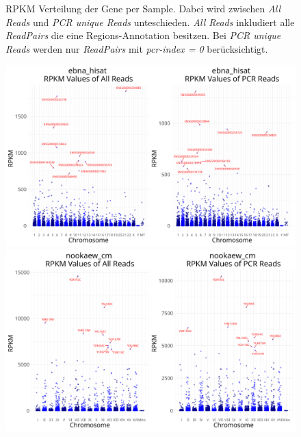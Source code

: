\documentclass[12pt]{article}
\begin{document}
\begin{figure}[htpb]
\begin{minipage}[t]{0.32\textwidth}
    \end{minipage}
    \caption{RPKM Verteilung der Gene per Sample. Dabei wird zwischen \textit{All Reads} und \textit{PCR unique Reads} unteschieden.
    \textit{All Reads} inkludiert alle \textit{ReadPairs} die eine Regions-Annotation besitzen. Bei \textit{PCR unique Reads} 
    werden nur \textit{ReadPairs} mit \textit{pcr-index = 0} berücksichtigt.}
    \label{fig:density}
\end{figure}

\begin{figure}[htpb]
    \centering
    \begin{minipage}{0.48\textwidth}
        \centering
        \includegraphics[width=\textwidth]{./plots/ebna_hisat/Plots/rpkm_mplot.png}
    \end{minipage}
    \hfill
    \begin{minipage}{0.48\textwidth}
        \centering
        \includegraphics[width=\textwidth]{./plots/nookaew_cm/Plots/rpkm_mplot.png}
    \end{minipage}
    \caption{}
\end{figure}
\end{document}
